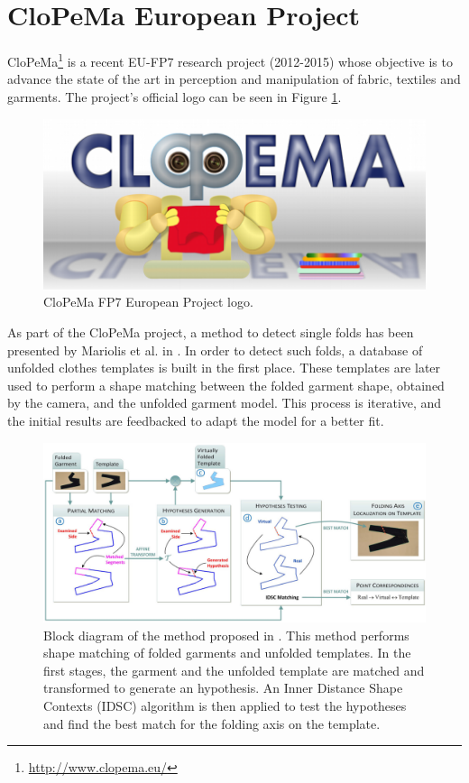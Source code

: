 \section{CloPeMa European Project}
\label{sota:clopema}

CloPeMa\footnote{\url{http://www.clopema.eu/}} is a recent EU-FP7 research project (2012-2015) whose objective is to advance the state of the art in perception and manipulation of fabric, textiles and garments. The project's official logo can be seen in Figure \ref{fig:SOTA_CloPeMa_logo}.

\begin{figure}[thpb]
    \centering
    \includegraphics[width=0.7
    \textwidth]{figures/SOTA_CloPeMa_logo.png}
    \caption{CloPeMa FP7 European Project logo.}
    \label{fig:SOTA_CloPeMa_logo}
\end{figure}

 As part of the CloPeMa project, a method to detect single folds has been presented by Mariolis et al. in \cite{Mariolis2013, Mariolis2015}. In order to detect such folds, a database of unfolded clothes templates is built in the first place. These templates are later used to perform a shape matching between the folded garment shape, obtained by the camera, and the unfolded garment model. This process is iterative, and the initial results are feedbacked to adapt the model for a better fit. 

\begin{figure}[thpb]
    \centering
    \includegraphics[width=\textwidth]{figures/SOTA_Mariolis_2015.png}
    \caption[Block diagram of the method proposed by Mariolis et al.]
    {Block diagram of the method proposed in \cite{Mariolis2015}. This method performs shape matching of folded garments and unfolded templates. In the first stages, the garment and the unfolded template are matched and transformed to generate an hypothesis. An Inner Distance Shape Contexts (IDSC) algorithm is then applied to test the hypotheses and find the best match for the folding axis on the template.}
    \label{fig:SOTA_Mariolis_2015}
\end{figure}

